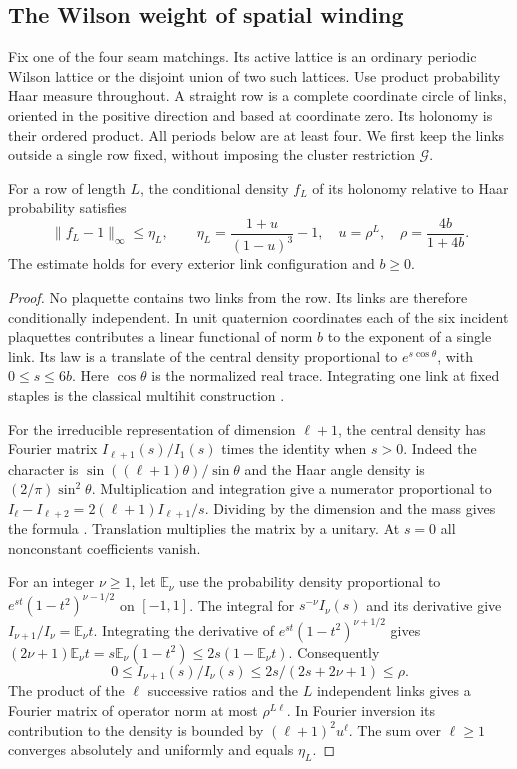\subsection{The Wilson weight of spatial winding}
\label{cl:sec:row-laws}

Fix one of the four seam matchings. Its active lattice is an ordinary
periodic Wilson lattice or the disjoint union of two such lattices.
Use product probability Haar measure throughout. A straight row is a
complete coordinate circle of links, oriented in the positive direction
and based at coordinate zero. Its holonomy is their ordered product.
All periods below are at least four. We first keep the links outside a
single row fixed, without imposing the cluster restriction $\mathcal G$.

\begin{theorem}\label{cl:thm:row-law}
For a row of length $L$, the conditional density $f_L$ of its holonomy
relative to Haar probability satisfies
\[
 \|f_L-1\|_\infty\le\eta_L,\qquad
 \eta_L=\frac{1+u}{(1-u)^3}-1,\quad
 u=\rho^L,\quad \rho=\frac{4b}{1+4b}.
\]
The estimate holds for every exterior link configuration and $b\ge0$.
\end{theorem}
\begin{proof}
No plaquette contains two links from the row. Its links are therefore
conditionally independent. In unit quaternion coordinates each of the
six incident plaquettes contributes a linear functional of norm $b$ to
the exponent of a single link. Its law is a translate of the central
density proportional to $e^{s\cos\theta}$, with $0\le s\le6b$.
Here $\cos\theta$ is the normalized real trace. Integrating one link
at fixed staples is the classical multihit construction \cite{PPR83}.

For the irreducible representation of dimension $\ell+1$, the central
density has Fourier matrix $I_{\ell+1}(s)/I_1(s)$ times the identity
when $s>0$. Indeed the character is
$\sin((\ell+1)\theta)/\sin\theta$ and the Haar angle density is
$(2/\pi)\sin^2\theta$. Multiplication and integration give a numerator
proportional to $I_\ell-I_{\ell+2}=2(\ell+1)I_{\ell+1}/s$.
Dividing by the dimension and the mass gives the formula
\cite{Bum13,Wat44}. Translation multiplies the matrix by a unitary.
At $s=0$ all nonconstant coefficients vanish.

For an integer $\nu\ge1$, let $\mathbb E_\nu$ use the probability
density proportional to $e^{st}(1-t^2)^{\nu-1/2}$ on $[-1,1]$.
The integral for $s^{-\nu}I_\nu(s)$ and its derivative give
$I_{\nu+1}/I_\nu=\mathbb E_\nu t$. Integrating the derivative of
$e^{st}(1-t^2)^{\nu+1/2}$ gives
$(2\nu+1)\mathbb E_\nu t=s\mathbb E_\nu(1-t^2)
\le2s(1-\mathbb E_\nu t)$. Consequently
\[
 0\le I_{\nu+1}(s)/I_\nu(s)
 \le 2s/(2s+2\nu+1)\le\rho .
\]
The product of the $\ell$ successive ratios and the $L$ independent
links gives a Fourier matrix of operator norm at most $\rho^{L\ell}$.
In Fourier inversion its contribution to the density is bounded by
$(\ell+1)^2 u^\ell$. The sum over $\ell\ge1$ converges absolutely and
uniformly and equals $\eta_L$.
\end{proof}

